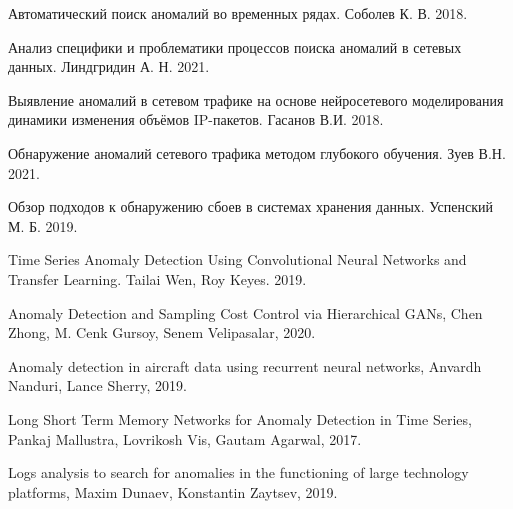 \documentclass[12pt,a4paper]{article}
\begin{document}
\begin{thebibliography}{10}

 Автоматический поиск аномалий во временных рядах. Соболев К. В. 2018.

 Анализ специфики и проблематики процессов поиска аномалий в сетевых данных. Линдгридин А. Н. 2021.

 Выявление аномалий в сетевом трафике на основе нейросетевого моделирования динамики изменения объёмов IP-пакетов. Гасанов В.И. 2018.

 Обнаружение аномалий сетевого трафика методом глубокого обучения. Зуев В.Н. 2021.

 Обзор подходов к обнаружению сбоев в системах хранения данных. Успенский М. Б. 2019.

 Time Series Anomaly Detection Using Convolutional Neural Networks and Transfer Learning. Tailai Wen, Roy Keyes. 2019.

 Anomaly Detection and Sampling Cost Control via Hierarchical GANs, Chen Zhong, M. Cenk Gursoy, Senem Velipasalar, 2020.

 Anomaly detection in aircraft data using recurrent neural networks, Anvardh Nanduri, Lance Sherry, 2019.

 Long Short Term Memory Networks for Anomaly Detection in Time Series, Pankaj Mallustra, Lovrikosh Vis, Gautam Agarwal, 2017.

 Logs analysis to search for anomalies in the functioning of large technology platforms, Maxim Dunaev, Konstantin Zaytsev, 2019.


\end{thebibliography}
\end{document}
